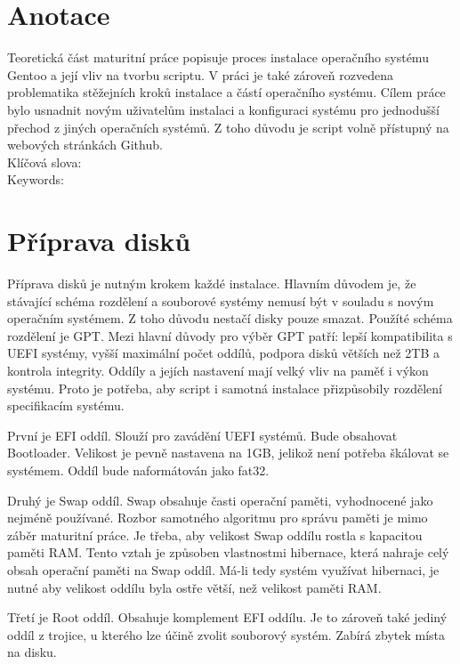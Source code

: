 \documentclass[12pt,a4paper,twoside,]{article}
\begin{document}
\newpage
\renewcommand{\contentsname}{\textsf{Obsah}}\tableofcontents

\newpage
\section{\textsf{Anotace}}
{Teoretická část maturitní práce popisuje proces instalace operačního systému Gentoo
	a její vliv na tvorbu scriptu. V práci je také zároveň rozvedena problematika stěžejních
	kroků instalace a částí operačního systému. Cílem práce bylo usnadnit novým uživatelům instalaci a konfiguraci
	systému pro jednodušší přechod z jiných operačních systémů. Z toho důvodu je script volně přístupný na webových stránkách Github. 
	\vspace{2cm}
	\\Klíčová slova:
	\\Keywords:
}


\newpage

\section{\textsf{Příprava disků}}
{Příprava disků je nutným krokem každé instalace. Hlavním důvodem je, 
že stávající schéma rozdělení a souborové systémy nemusí být v souladu s novým operačním systémem. 
Z toho důvodu nestačí disky pouze smazat. Použíté schéma rozdělení je GPT. 
Mezi hlavní důvody pro výběr GPT patří: lepší kompatibilita s UEFI systémy, 
vyšší maximální počet oddílů, podpora disků větších než 2TB a kontrola integrity.
Oddíly a jejích nastavení mají velký vliv na paměť i výkon systému. Proto je potřeba, 
aby script i samotná instalace přizpůsobily rozdělení specifikacím systému.} 

{První je EFI oddíl. Slouží pro zavádění UEFI systémů. Bude obsahovat Bootloader. 
Velikost je pevně nastavena na 1GB, jelikož není potřeba škálovat se systémem.
Oddíl bude naformátován jako fat32.}

{Druhý je Swap oddíl. Swap obsahuje časti operační paměti, vyhodnocené jako nejméně používané. 
Rozbor samotného algoritmu pro správu paměti je mimo záběr maturitní práce. Je třeba,
aby velikost Swap oddílu rostla s kapacitou paměti RAM. Tento vztah je způsoben vlastnostmi hibernace, 
která nahraje celý obsah operační paměti na Swap oddíl. Má-li tedy systém využívat hibernaci, je nutné
aby velikost oddílu byla ostře větší, než velikost paměti RAM. }

{Třetí je Root oddíl. Obsahuje komplement EFI oddílu. Je to zároveň také jediný oddíl z trojice, 
u kterého lze účině zvolit souborový systém. Zabírá zbytek místa na disku.}
\end{document}
